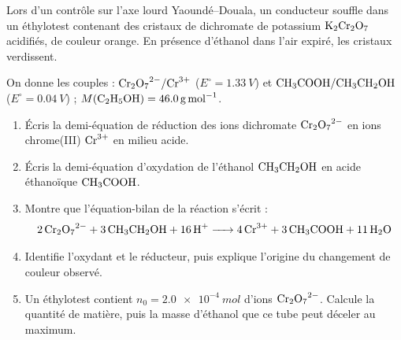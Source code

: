 \documentclass[11pt]{article}
\begin{document}
\begin{exercice}
Lors d'un contrôle sur l'axe lourd Yaoundé--Douala, un conducteur souffle dans un éthylotest contenant des cristaux de dichromate de potassium $\ce{K2Cr2O7}$ acidifiés, de couleur orange. En présence d'éthanol dans l'air expiré, les cristaux verdissent.

On donne les couples : $\ce{Cr2O7^2-}/\ce{Cr^3+}$ ($E^\circ = \SI{1,33}{V}$) et $\ce{CH3COOH}/\ce{CH3CH2OH}$ ($E^\circ = \SI{0,04}{V}$) ; $M(\ce{C2H5OH}) = \SI{46,0}{g.mol^{-1}}$.
\begin{enumerate}
\item Écris la demi-équation de réduction des ions dichromate $\ce{Cr2O7^2-}$ en ions chrome(III) $\ce{Cr^3+}$ en milieu acide.
\item Écris la demi-équation d'oxydation de l'éthanol $\ce{CH3CH2OH}$ en acide éthanoïque $\ce{CH3COOH}$.
\item Montre que l'équation-bilan de la réaction s'écrit :
\[ \ce{2Cr2O7^2- + 3CH3CH2OH + 16H+ -> 4Cr^3+ + 3CH3COOH + 11H2O} \]
\item Identifie l'oxydant et le réducteur, puis explique l'origine du changement de couleur observé.
\item Un éthylotest contient $n_0 = \SI{2,0e-4}{mol}$ d'ions $\ce{Cr2O7^2-}$. Calcule la quantité de matière, puis la masse d'éthanol que ce tube peut déceler au maximum.
\end{enumerate}
\end{exercice}
\end{document}
